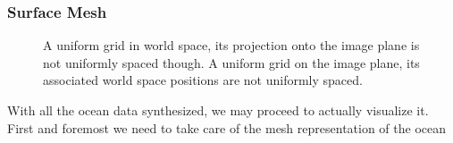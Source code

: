 \subsubsection{Surface Mesh}
%
\begin{figure}
\centering
{}
\caption{
A uniform grid in world space, its projection onto the image plane is not
uniformly spaced though.
A uniform grid on the image plane, its associated world space positions
are not uniformly spaced.
}
\label{fig:dprojectedgrid}
\end{figure}
%
With all the ocean data synthesized, we may proceed to actually visualize it.
First and foremost we need to take care of the mesh representation of the ocean
